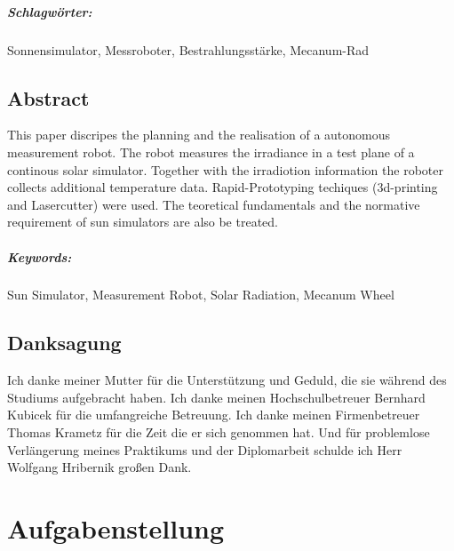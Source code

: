 \documentclass[a4paper,bibtotoc,oneside]{scrbook}
\begin{document}
\paragraph*{Schlagwörter:} Sonnensimulator, Messroboter, Bestrahlungsstärke, Mecanum-Rad


\newpage

\section*{Abstract}\thispagestyle{empty}
This paper discripes the planning and the realisation of a autonomous measurement robot. The robot measures the irradiance in a test plane of a continous solar simulator. Together with the irradiotion information the roboter collects additional temperature data. Rapid-Prototyping techiques (3d-printing and Lasercutter) were used. The teoretical fundamentals and the normative requirement of sun simulators are also be treated.
\\ \vfill
\paragraph*{Keywords:} Sun Simulator, Measurement Robot, Solar Radiation, Mecanum Wheel
\newpage

\section*{Danksagung}\thispagestyle{empty}
Ich danke meiner Mutter für die Unterstützung und Geduld, die sie während des Studiums aufgebracht haben.
Ich danke meinen Hochschulbetreuer Bernhard Kubicek für die umfangreiche Betreuung.
Ich danke meinen Firmenbetreuer Thomas Krametz für die Zeit die er sich genommen hat.
Und für problemlose Verlängerung meines Praktikums und der Diplomarbeit schulde ich Herr Wolfgang Hribernik großen Dank.
\newpage

\tableofcontents\thispagestyle{empty}
\newpage

\setcounter{page}{1}

\chapter{Aufgabenstellung}
\end{document}
